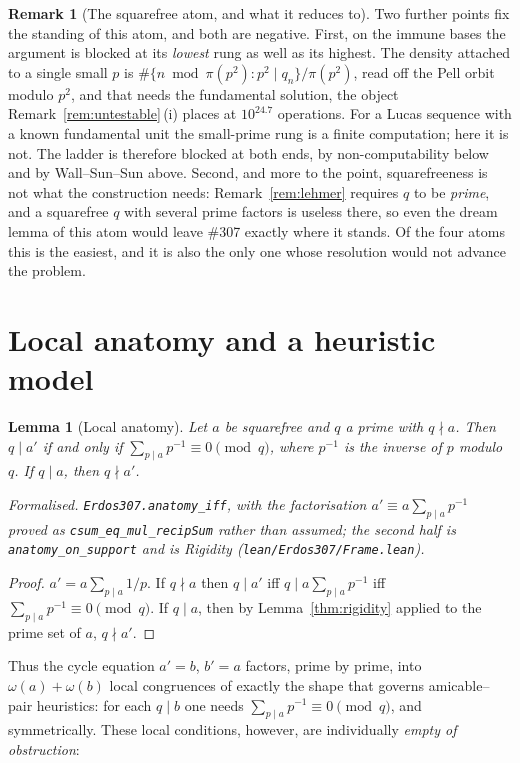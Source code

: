 \documentclass[11pt]{article}
\newtheorem{lemma}[theorem]{Lemma}
\theoremstyle{definition}
\newtheorem{remark}[theorem]{Remark}
\begin{document}
\begin{remark}[The squarefree atom, and what it reduces to]
Two further points fix the standing of this atom, and both are negative. First, on the immune bases
the argument is blocked at its \emph{lowest} rung as well as its highest. The density attached to a
single small $p$ is $\#\{n\bmod\pi(p^2):p^2\mid q_n\}/\pi(p^2)$, read off the Pell orbit modulo
$p^2$, and that needs the fundamental solution, the object Remark~\ref{rem:untestable}\,(i) places
at $10^{24.7}$ operations. For a Lucas sequence with a known fundamental unit the small-prime rung is
a finite computation; here it is not. The ladder is therefore blocked at both ends, by
non-computability below and by Wall--Sun--Sun above. Second, and more to the point, squarefreeness is
not what the construction needs: Remark~\ref{rem:lehmer} requires $q$ to be \emph{prime}, and a
squarefree $q$ with several prime factors is useless there, so even the dream lemma of this atom
would leave \#307 exactly where it stands. Of the four atoms this is the easiest, and it is also the
only one whose resolution would not advance the problem.
\end{remark}

\section{Local anatomy and a heuristic model}\label{sec:anatomy}

\begin{lemma}[Local anatomy]\label{lem:anatomy}
Let $a$ be squarefree and $q$ a prime with $q\nmid a$. Then $q\mid a'$ if and only if
$\sum_{p\mid a}p^{-1}\equiv 0\pmod q$, where $p^{-1}$ is the inverse of $p$ modulo $q$. If $q\mid a$,
then $q\nmid a'$.

\textup{Formalised.} \texttt{Erdos307.anatomy\_iff}, with the factorisation
$a'\equiv a\sum_{p\mid a}p^{-1}$ proved as \texttt{csum\_eq\_mul\_recipSum} rather than assumed; the
second half is \texttt{anatomy\_on\_support} and is Rigidity
\textup{(\texttt{lean/Erdos307/Frame.lean})}.
\end{lemma}
\begin{proof}
$a'=a\sum_{p\mid a}1/p$. If $q\nmid a$ then $q\mid a'$ iff $q\mid a\sum_{p\mid a}p^{-1}$ iff
$\sum_{p\mid a}p^{-1}\equiv0\pmod q$. If $q\mid a$, then by Lemma~\ref{thm:rigidity}
applied to the prime set of $a$, $q\nmid a'$.
\end{proof}

Thus the cycle equation $a'=b$, $b'=a$ factors, prime by prime, into
$\omega(a)+\omega(b)$ local congruences of exactly the shape that governs amicable--pair heuristics:
for each $q\mid b$ one needs $\sum_{p\mid a}p^{-1}\equiv0\pmod q$, and symmetrically. These local
conditions, however, are individually \emph{empty of obstruction}:
\end{document}
